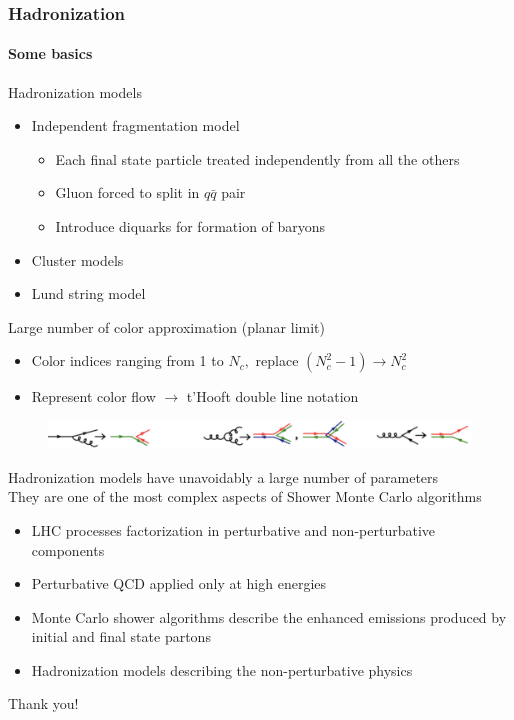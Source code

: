 \documentclass[aspectratio=43]{beamer}
\begin{document}
\begin{frame}

\frametitle{Hadronization}
\framesubtitle{Some basics}
	
	\footnotesize Hadronization models
	\begin{itemize}
		\item Independent fragmentation model
		\begin{itemize}
			\item \footnotesize Each final state particle treated independently from all the others
			\item \footnotesize Gluon forced to split in $q\bar{q}$ pair
			\item \footnotesize Introduce diquarks for formation of baryons
		\end{itemize}
		\item Cluster models
		\item Lund string model
	\end{itemize}

	\footnotesize Large number of color approximation (planar limit)
	\begin{itemize}
		\item \footnotesize Color indices ranging from 1 to $N_{c},$ replace $(N_{c}^{2} - 1) \rightarrow N_{c}^{2}$  
		\item \footnotesize Represent color flow $\rightarrow$ t'Hooft double line notation
	\end{itemize}
	
	\begin{figure}
		\includegraphics[width = 8.5 cm]{plots/hadronization.png}
	\end{figure}

	\footnotesize {\color{red}Hadronization models have unavoidably a large number of parameters \\
	\footnotesize They are one of the most complex aspects of Shower Monte Carlo algorithms}

\end{frame}

\begin{frame}
	
	\begin{itemize}
		\item \footnotesize LHC processes factorization in perturbative and non-perturbative components
		\item \footnotesize Perturbative QCD applied only at high energies
		\item \footnotesize Monte Carlo shower algorithms describe the enhanced emissions produced by initial and final state partons
		\item \footnotesize Hadronization models describing the non-perturbative physics
	\end{itemize}

\end{frame}

\begin{frame}

	\vspace{1cm}
	\center \color{blue} \footnotesize Thank you!


\end{frame}
\end{document}
